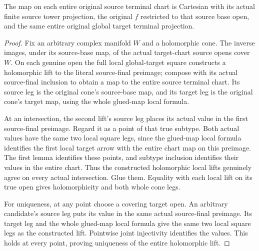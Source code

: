 \begin{theorem}
\label{hir:original-entire-source-terminal-chart-global-target-cartesian}
\leanok
{}
The map on each entire original source terminal chart is Cartesian with
its actual finite source tower projection, the original $f$ restricted
to that source base open, and the same entire original global target
terminal projection.
\end{theorem}
\begin{proof}
Fix an arbitrary complex manifold $W$ and a holomorphic cone. The inverse
images, under its source-base map, of the actual target-chart source
opens cover $W$. On each genuine open the full local global-target square
constructs a holomorphic lift to the literal source-final preimage; compose
with its actual source-final inclusion to obtain a map to the entire
source terminal chart. Its source leg is the original cone's source-base
map, and its target leg is the original cone's target map, using the
whole glued-map local formula.

At an intersection, the second lift's source leg places its actual value
in the first source-final preimage. Regard it as a point of that true
subtype. Both actual values have the same two local square legs, since
the glued-map local formula identifies the first local target arrow with
the entire chart map on this preimage. The first lemma identifies these
points, and subtype inclusion identifies their values in the entire
chart. Thus the constructed holomorphic local lifts genuinely agree on
every actual intersection. Glue them. Equality with each local lift on
its true open gives holomorphicity and both whole cone legs.

For uniqueness, at any point choose a covering target open. An arbitrary
candidate's source leg puts its value in the same actual source-final
preimage. Its target leg and the whole glued-map local formula give the
same two local square legs as the constructed lift. Pointwise joint
injectivity identifies the values. This holds at every point, proving
uniqueness of the entire holomorphic lift.
\end{proof}
